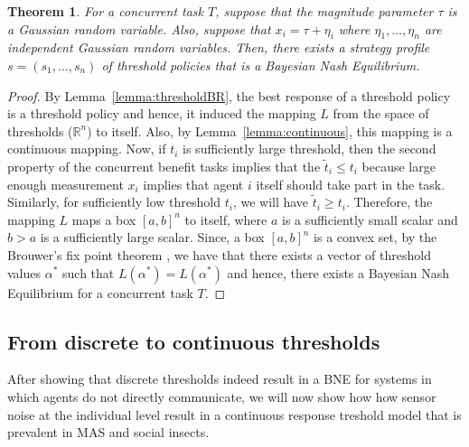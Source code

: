 \documentclass[conference]{ieeeconf}
\newtheorem{theorem}{Theorem}
\def\R{\mathbb{R}}
\begin{document}
\begin{theorem}\label{thrm:mainthrm}
For a concurrent task $T$, suppose that the magnitude parameter $\tau$ is a Gaussian random variable. Also, suppose that $x_i=\tau+\eta_i$ where $\eta_1,\ldots,\eta_n$ are independent Gaussian random variables. Then, there exists a strategy profile $s=(s_1,\ldots,s_n)$ of threshold policies that is a Bayesian Nash Equilibrium.
\end{theorem}
\begin{proof}
By Lemma~\ref{lemma:thresholdBR}, the best response of a threshold policy is a threshold policy and hence, it induced the mapping $L$ from the space of thresholds ($\R^n$) to itself. Also, by Lemma~\ref{lemma:continuous}, this mapping is a continuous mapping. Now, if $t_i$ is sufficiently large threshold, then the second property of the concurrent benefit tasks implies that the $\tilde{t}_i\leq t_i$ because large enough measurement $x_i$ implies that agent $i$ itself should take part in the task. Similarly, for sufficiently low threshold $t_i$, we will have $\tilde{t}_i\geq t_i$. Therefore, the mapping $L$ maps a box $[a,b]^n$ to itself, where $a$ is a sufficiently small scalar and $b>a$ is a sufficiently large scalar. Since, a box $[a,b]^n$ is a convex set, by the Brouwer's fix point theorem \cite{border1990fixed}, we have that there exists a vector of threshold values $\alpha^*$ such that $L(\alpha^*)=L(\alpha^*)$ and hence, there exists a Bayesian Nash Equilibrium for a concurrent task $T$.
\end{proof}


\subsection{From discrete to continuous thresholds}\label{subsec:sigfun}
After showing that discrete thresholds indeed result in a BNE for systems in which agents do not directly communicate, we will now show how how sensor noise at the individual level result in a continuous response treshold model that is prevalent in MAS and social insects. 
\end{document}

